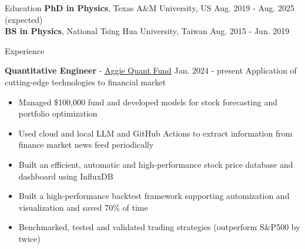 \documentclass{resume}
\begin{document}
\vspace{-1.5em}
\begin{rSection}{Education}
\vspace{-0.25em}
{\bf PhD in Physics}, Texas A\&M University, US \hfill {Aug. 2019 - Aug. 2025 (expected)} \\
{\bf BS in Physics}, National Tsing Hua University, Taiwan \hfill {Aug. 2015 - Jun. 2019}
\end{rSection}


\begin{rSection}{Experience}
    \vspace{-1.5em}
    \item \textbf{Quantitative Engineer} - \href{https://www.linkedin.com/company/aggieqf}{Aggie Quant Fund} \hfill Jan. 2024 - present
        \newline\hspace*{0.5em} {\normalsize Application of cutting-edge technologies to financial market}
        \begin{itemize}
        \item Managed \$100,000 fund and developed models for stock forecasting and portfolio optimization
        \item Used cloud and local LLM and GitHub Actions to extract information from finance market news feed periodically
        \item Built an efficient, automatic and high-performance stock price database and dashboard using InfluxDB
        \item Built a high-performance backtest framework supporting automization and visualization and saved 70\% of time
        \item Benchmarked, tested and validated trading strategies (outperform S\&P500 by twice)
        \end{itemize}


\end{rSection}
\end{document}
